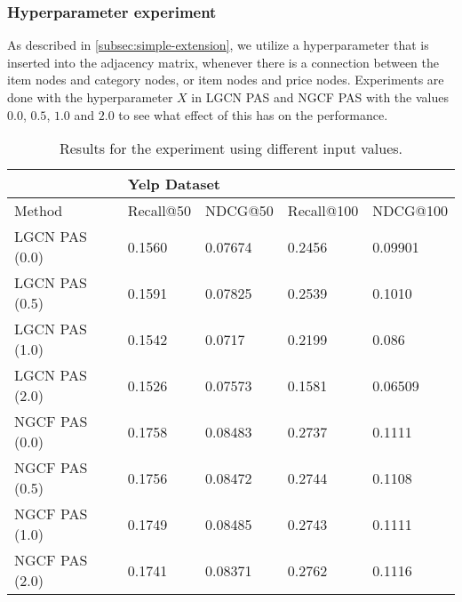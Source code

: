\subsubsection{Hyperparameter experiment}
As described in \autoref{subsec:simple-extension}, we utilize a hyperparameter that is inserted into the adjacency matrix, whenever there is a connection between the item nodes and category nodes, or item nodes and price nodes.
Experiments are done with the hyperparameter $X$ in LGCN PAS and NGCF PAS with the values $0.0$, $0.5$, $1.0$ and $2.0$ to see what effect of this has on the performance.
\begin{table*}[h!]
    \centering
    \begin{tabular}{|l|l|l|l|l|}
        \hline
        \rowcolor[HTML]{FFFFFF}
                       & \multicolumn{4}{l|}{\cellcolor[HTML]{FFFFFF}Yelp Dataset}                                   \\ \hline
        Method         & Recall@50                                                 & NDCG@50 & Recall@100 & NDCG@100 \\ \hline
        LGCN PAS (0.0) & 0.1560                                                    & 0.07674 & 0.2456     & 0.09901  \\ \hline
        LGCN PAS (0.5) & 0.1591                                                    & 0.07825 & 0.2539     & 0.1010   \\ \hline
        LGCN PAS (1.0) & 0.1542                                                    & 0.0717  & 0.2199     & 0.086    \\ \hline
        LGCN PAS (2.0) & 0.1526                                                    & 0.07573 & 0.1581     & 0.06509  \\ \hline
        NGCF PAS (0.0) & 0.1758                                                    & 0.08483 & 0.2737     & 0.1111   \\ \hline
        NGCF PAS (0.5) & 0.1756                                                    & 0.08472 & 0.2744     & 0.1108   \\ \hline
        NGCF PAS (1.0) & 0.1749                                                    & 0.08485 & 0.2743     & 0.1111   \\ \hline
        NGCF PAS (2.0) & 0.1741                                                    & 0.08371 & 0.2762     & 0.1116   \\ \hline
    \end{tabular}
    \caption{Results for the experiment using different input values.}
    \label{tab:hyperparameter-results}
\end{table*}
